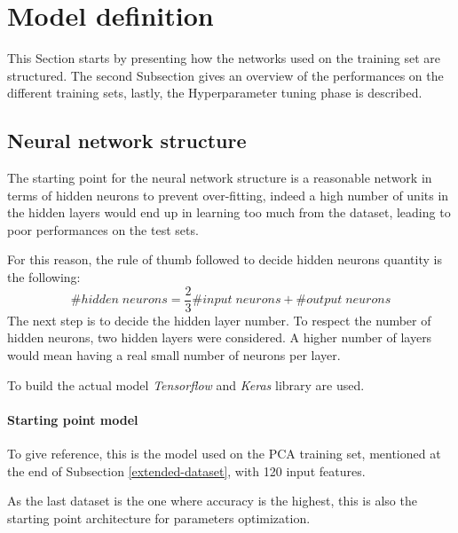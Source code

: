 \section{Model definition}
\label{model-definition}
This Section starts by presenting how the networks used on the training set are 
structured. The second Subsection gives an overview of the performances 
on the different training sets, lastly, the Hyperparameter tuning phase
is described.

\subsection{Neural network structure}
The starting point for the neural network structure is a 
reasonable network in terms of hidden neurons to prevent over-fitting, 
indeed a high number of units in the hidden layers would end up in learning 
too much from the dataset, leading to poor performances on the test sets.

For this reason, the rule of thumb followed to decide hidden neurons quantity is the 
following: 
$$\#\mathit{hidden\; neurons} = \frac{2}{3}\#\mathit{input\;neurons}
+ \#\mathit{output\;neurons}$$
The next step is to decide the hidden layer number. To respect the 
number of hidden neurons, two hidden layers were considered. 
A higher number of layers would mean having a real small number of neurons per layer.

To build the actual model \emph{Tensorflow} and \emph{Keras} library 
are used.~\cite{tensorflow}~\cite{keras}

\paragraph{Starting point model}
To give reference, this is the model used on the PCA training set, mentioned at 
the end of Subsection \vref{extended-dataset}, with 
120 input features.

As the last dataset is the one where accuracy is the highest, this is 
also the starting point architecture for parameters optimization.

